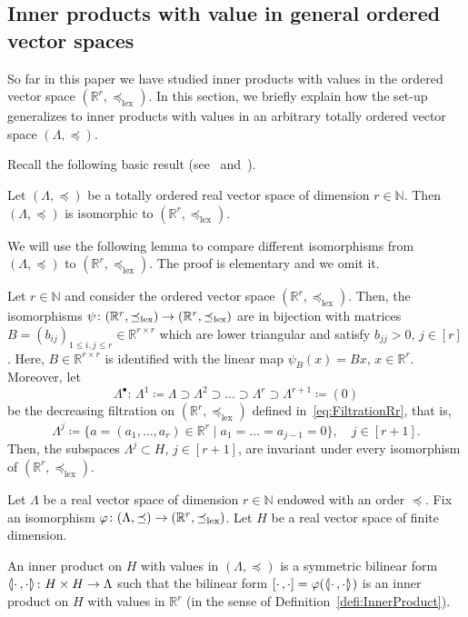 \documentclass[AHL,Unicode,longabstracts]{cedram}
\newcommand{\llangle}{\mathopen{\langle\mkern -3.1mu\lvert}}
\newcommand{\rrangle}{\mathclose{\rvert\mkern -3.1mu\rangle}}
\newcommand{\highinn}[2]{{\llangle#2\rrangle_{#1}}}
\newcommand{\R}{\mathbb{R}}
\newcommand{\N}{\mathbb{N}}
\newcommand{\lexeq}{\preceq_{\mathrm{lex}}}
\renewcommand*{\to}{\mathchoice{\longrightarrow}{\rightarrow}{\rightarrow}{\rightarrow}}
\begin{document}
\subsection{Inner products with value in general ordered vector spaces}
\label{ss:InnerProductsGeneralValueGroup}
So far in this paper we have studied inner products with values in the ordered vector space $(\R^r, \lexeq)$. In this section, we briefly explain how the set-up generalizes to inner products with values in an arbitrary totally ordered vector space $(\Lambda, \preceq)$.

Recall the following basic result (see~\cite[Section~XV.2]{Bir-Lattice} and~\cite{HW52}).
\begin{theo} \label{thm:Birkhoff}
Let $(\Lambda, \preceq)$ be a totally ordered real vector space of dimension $r \in \N$. Then $(\Lambda, \preceq)$ is isomorphic to $(\R^r, \lexeq)$.
\end{theo}

We will use the following lemma to compare different isomorphisms from $(\Lambda, \preceq)$ to $(\R^r, \lexeq)$. The proof is elementary and we omit it.
\begin{lemm} \label{lem:LexicographicAutomorphisms}
Let $r \in \N$ and consider the ordered vector space $(\R^r, \lexeq)$. Then, the isomorphisms $\psi \colon (\R^r, \lexeq) \to(\R^r, \lexeq)$ are in bijection with matrices $B = (b_{ij})_{1 \le i,j \le r} \in \R^{r \times r}$ which are lower triangular and satisfy $b_{jj}>0$, $j \in [r]$. Here, $B \in \R^{r \times r}$ is identified with the linear map $\psi_B (x) = B x$, $x \in \R^r$. Moreover, let
\[
\Lambda^\bullet \colon \, \Lambda^1 \coloneq \Lambda\supset \Lambda^2 \supset \dots \supset \Lambda^{r} \supset \Lambda^{r+1} \coloneq (0)
\]
be the decreasing filtration on $(\R^r, \lexeq)$ defined in~\eqref{eq:FiltrationRr}, that is,
\[
\Lambda^j \coloneqq \{a = (a_1, \dots, a_r) \in \R^r \mid a_1 = \dots =a_{j-1}=0\}, \quad j \in [r+1].
\]
Then, the subspaces $\Lambda^j \subset H$, $j \in[r+1]$, are invariant under every isomorphism of $(\R^r, \lexeq)$.
\end{lemm}




Let $\Lambda$ be a real vector space of dimension $r \in \N$ endowed with an order $\preceq$. Fix an isomorphism $\varphi \colon (\Lambda, \preceq) \to (\R^r, \lexeq)$. Let $H$ be a real vector space of finite dimension.

\begin{defi}\label{defi:GeneralVectorSpaceInnerProduct}
An inner product on $H$ with values in $(\Lambda, \preceq)$ is a symmetric bilinear form $\highinn{}{\cdot \,, \cdot} \colon H \times H \to \Lambda$ such that the bilinear form $[\cdot \,, \cdot] = \varphi(\highinn{}{\cdot \,, \cdot})$ is an inner product on $H$ with values in $\R^r$ (in the sense of Definition~\ref{defi:InnerProduct}).%
\end{defi}
\end{document}
